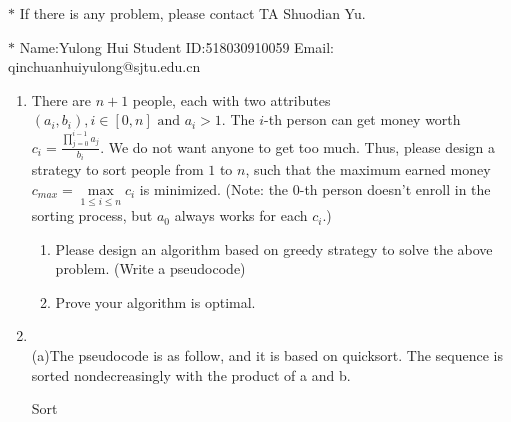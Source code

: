 \documentclass[12pt,a4paper]{article}
\makeatletter
\newtheorem*{solution}{Solution}
\theoremstyle{definition}
\renewenvironment{solution}[1][Solution] {\par\pushQED{\qed}\normalfont\topsep6\p@\@plus6\p@\relax\trivlist\item[\hskip\labelsep\bfseries#1\@addpunct{.}]\ignorespaces}{\popQED\endtrivlist\@endpefalse} \makeatother
\makeatother
\begin{document}
\noindent

\noindent{}
\begin{center}
\footnotesize{\color{red}$*$ If there is any problem, please contact TA Shuodian Yu.}

\footnotesize{\color{blue}$*$ Name:Yulong Hui  \quad Student ID:518030910059 \quad Email: qinchuanhuiyulong@sjtu.edu.cn}
\end{center}

\begin{enumerate}
    \item
    There are $n+1$ people, each with two attributes $(a_i,b_i), i\in[0,n] \text{ and } a_i>1$. The $i$-th person can get money worth $c_i = \frac{\prod_{j=0}^{i-1}{a_j}}{b_i}$. We do not want anyone to get too much. Thus, please design a strategy to sort people from $1$ to $n$, such that the maximum earned money $c_{max}=\max\limits_{1\leq i\leq n} c_i$ is minimized. (Note: the 0-th person doesn't enroll in the sorting process, but $a_0$ always works for each $c_i$.)
    \begin{enumerate}
        \item Please design an algorithm based on greedy strategy to solve the above problem. (Write a pseudocode)
        \item Prove your algorithm is optimal.
    \end{enumerate}

  \begin{solution}
  	~\\
  	(a)The pseudocode is as follow, and  it is based on quicksort. The sequence is sorted nondecreasingly with the product of a and b.
  	  
      \begin{minipage}[t]{0.8\textwidth}
     	\begin{algorithm}[H]
     		
     		\BlankLine
     		\caption{Sort}\label{Alg_Quick}
     		
     		

\end{algorithm}
\end{minipage}
\end{solution}
\end{enumerate}
\end{document}
